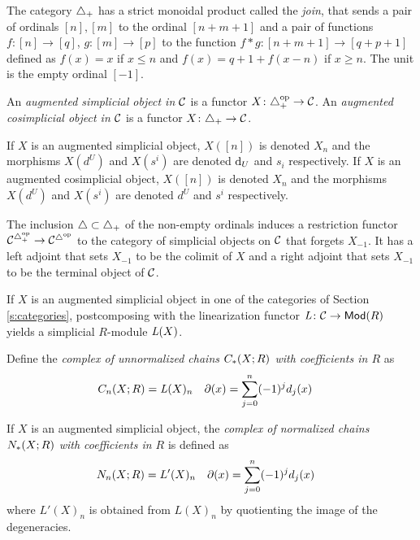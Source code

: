 The category $\asimplex$ has a strict monoidal product called the \emph{join}, that sends a pair of ordinals $[n],[m]$ to the ordinal $[n+m+1]$ and a pair of functions $f \colon [n] \to [q]$, $g \colon [m] \to [p]$ to the function $f*g \colon [n+m+1] \to [q+p+1]$ defined as $f(x) = x$ if $x\leq n$ and $f(x) = q+1+f(x-n)$ if $x \geq n$. The unit is the empty ordinal $[-1]$.

\begin{definition}
	An \emph{augmented simplicial object in $\cC$} is a functor $X \colon \asimplex^\mathrm{op} \to \cC$.
	An \emph{augmented cosimplicial object in $\cC$} is a functor $X \colon \asimplex \to \cC$.
\end{definition}

If $X$ is an augmented simplicial object, $X([n])$ is denoted $X_n$ and the morphisms $X(d^U)$ and $X(s^i)$ are denoted $\d_U$ and $s_i$ respectively. If $X$ is an augmented cosimplicial object, $X([n])$ is denoted $X_n$ and the morphisms $X(d^U)$ and $X(s^i)$ are denoted $d^U$ and $s^i$ respectively.

The inclusion $\simplex \subset \asimplex$ of the non-empty ordinals induces a restriction functor $\cC^{\asimplex^{\op}} \to \cC^{\simplex^{\op}}$ to the category of simplicial objects on $\cC$ that forgets $X_{-1}$. It has a left adjoint that sets $X_{-1}$ to be the colimit of $X$ and a right adjoint that sets $X_{-1}$ to be the terminal object of $\cC$.

If $X$ is an augmented simplicial object in one of the categories of Section \ref{s:categories}, postcomposing with the linearization functor $\abel \colon \cC \to \Mod{R}$ yields a simplicial $R$-module $\abel(X)$.

Define the \emph{complex of unnormalized chains $\ucadenas(X;R)$ with coefficients in $R$} as
\begin{align*}
	\ucadenas[n](X;R) &= \abel(X)_n
	&
	\partial(x) &= \sum_{j=0}^{n} (-1)^jd_j(x)
\end{align*}

If $X$ is an augmented simplicial object, the \emph{complex of normalized chains $\cadenas(X;R)$ with coefficients in $R$} is defined as
\begin{align*}
	\cadenas[n](X;R) &= L'(X)_n
	&
	\partial(x) &= \sum_{j=0}^{n} (-1)^jd_j(x)
\end{align*}
where $L'(X)_n$ is obtained from $L(X)_n$ by quotienting the image of the degeneracies.

